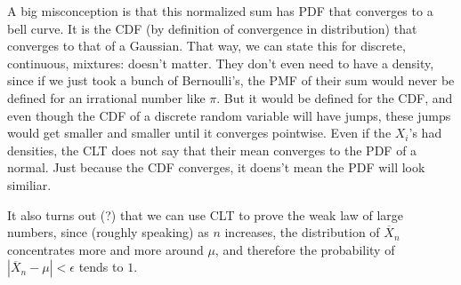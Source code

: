   A big misconception is that this normalized sum has PDF that converges to a bell curve. It is the CDF (by definition of convergence in distribution) that converges to that of a Gaussian. That way, we can state this for discrete, continuous, mixtures: doesn't matter. They don't even need to have a density, since if we just took a bunch of Bernoulli's, the PMF of their sum would never be defined for an irrational number like $\pi$. But it would be defined for the CDF, and even though the CDF of a discrete random variable will have jumps, these jumps would get smaller and smaller until it converges pointwise. Even if the $X_i$'s had densities, the CLT does not say that their mean converges to the PDF of a normal. Just because the CDF converges, it doens't mean the PDF will look similiar. 

  It also turns out (?) that we can use CLT to prove the weak law of large numbers, since (roughly speaking) as $n$ increases, the distribution of $\overline{X}_n$ concentrates more and more around $\mu$, and therefore the probability of $|\overline{X}_n - \mu| < \epsilon$ tends to $1$. 


